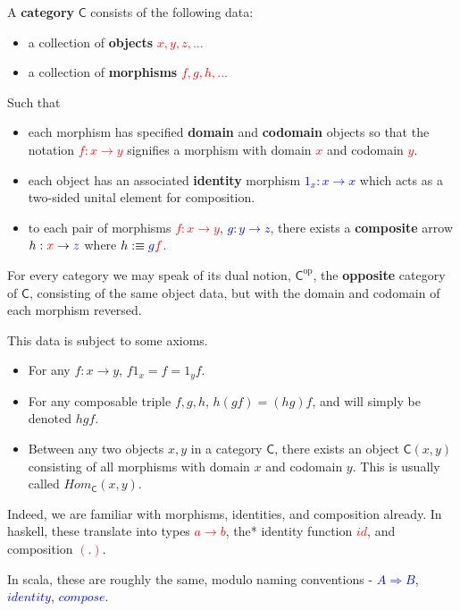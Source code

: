 \documentclass[tikz]{beamer}
\newcommand{\cat}[1]{\bm{ \mathsf{#1} }}
\newcommand{\cc}{\cat{C}}
\newcommand{\op}[1]{#1^{\text{op}}}
\newcommand{\opc}{\op{\cc}}
\newcommand{\red}[1]{\textcolor{red}{#1}}
\newcommand{\mred}[1]{\textcolor{red}{$#1$}}
\newcommand{\blue}[1]{\textcolor{blue}{#1}}
\newcommand{\mblue}[1]{\textcolor{blue}{$#1$}}
\theoremstyle{definition}
\begin{document}
\frame
{
	\begin{definition}[Category]
		A \textbf{category} $\cc$ consists of the following data: 
		
		\begin{itemize}
			\item a collection of \textbf{objects} \mred{x, y, z,...}
			\item a collection of \textbf{morphisms} \mred{f,g,h,...}
		\end{itemize}
		
		Such that 
		
		\begin{itemize}
			\item each morphism has specified \textbf{domain} and \textbf{codomain} objects so that the notation \mred{f : x \to y} signifies a morphism with domain \mred{x} and codomain \mred{y}. 
			\item each object has an associated \textbf{identity} morphism \mblue{1_x : x \to x} which acts as a two-sided unital element for composition.
			\item to each pair of morphisms \mred{f : x \to y}, \mblue{g : y \to z}, there exists a \textbf{composite} arrow $h : \red{x} \to \blue{z}$ where $h :\equiv \blue{g}\red{f}$. 
		\end{itemize}
	\end{definition}
}

\frame
{
	For every category we may speak of its dual notion, $\opc$, the \textbf{opposite} category of $\cc$, consisting of the same object data, but with the domain and codomain of each morphism reversed.
}

\frame
{
	This data is subject to some axioms. 
	
	\begin{itemize}
	
		\item For any $f : x \to y$, $f1_x = f =  1_y f$. 
		\item For any composable triple $f,g,h$, $h(gf) = (hg)f$, and will simply be denoted $hgf$.
		\item Between any two objects $x, y$ in a category $\cc$, there exists an object $\cc(x,y)$ consisting of all morphisms with domain $x$ and codomain $y$. This is usually called $Hom_{\cc}(x, y)$.
	\end{itemize}
}

\frame
{

	Indeed, we are familiar with morphisms, identities, and composition already. In haskell, these translate into types \mred{a \to b}, the* identity function \mred{id}, and composition \mred{(.)}. 
	
	In scala, these are roughly the same, modulo naming conventions - \mblue{A \Rightarrow B}, \mblue{identity}, \mblue{compose}.  
}
\end{document}
